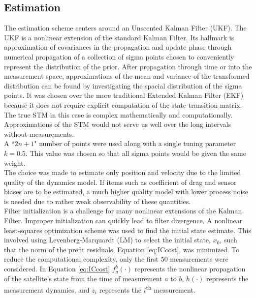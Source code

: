 \documentclass[11pt]{article}
\begin{document}
\subsection{Estimation}

The estimation scheme centers around an Unscented Kalman Filter (UKF). The UKF is a nonlinear extension of the standard Kalman Filter. Its hallmark is approximation of covariances in the propagation and update phase through numerical propagation of a collection of sigma points chosen to conveniently represent the distribution of the prior. After propagation through time or into the measurement space, approximations of the mean and variance of the transformed distribution can be found by investigating the spacial distribution of the sigma points. It was chosen over the more traditional Extended Kalman Filter (EKF) because it does not require explicit computation of the state-transition matrix. The true STM in this case is complex mathematically and computationally. Approximations of the STM would not serve us well over the long intervals without measurements. \\

A ``$2n+1$" number of points were used along with a single tuning parameter $k=0.5$. This value was chosen so that all sigma points would be given the same weight. \\

The choice was made to estimate only position and velocity due to the limited quality of the dynamics model. If items such as coefficient of drag and sensor biases are to be estimated, a much higher quality model with lower process noise is needed due to rather weak observability of these quantities. \\

Filter initialization is a challenge for many nonlinear extensions of the Kalman Filter. Improper initialization can quickly lead to filter divergence. A nonlinear least-squares optimization scheme was used to find the initial state estimate. This involved using Levenberg-Marquardt (LM) to select the initial state, $x_0$, such that the norm of the prefit residuals, Equation \eqref{eq:ICcost}, was minimized. To reduce the computational complexity, only the first 50 measurements were considered. In Equation \eqref{eq:ICcost} $f_a^b(\cdot)$ represents the nonlinear propagation of the satellite's state from the time of measurement $a$ to $b$, $h(\cdot)$ represents the measurement dynamics, and $z_i$ represents the $i$\textsuperscript{th} measurement. 
\end{document}
